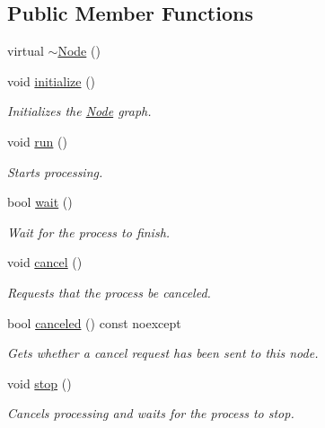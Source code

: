 \subsection*{Public Member Functions}
\begin{DoxyCompactItemize}
\item 
virtual \hyperlink{classdg_1_1deepcore_1_1_node_adb976ec538663efc018da5093005dfa1}{$\sim$\+Node} ()
\item 
void \hyperlink{classdg_1_1deepcore_1_1_node_a3831f1668d879b332399e924dbc9353f}{initialize} ()
\begin{DoxyCompactList}\small\item\em Initializes the \hyperlink{classdg_1_1deepcore_1_1_node}{Node} graph. \end{DoxyCompactList}\item 
void \hyperlink{classdg_1_1deepcore_1_1_node_adcb95b4c68f66b47a48e74cde6ae4365}{run} ()
\begin{DoxyCompactList}\small\item\em Starts processing. \end{DoxyCompactList}\item 
bool \hyperlink{classdg_1_1deepcore_1_1_node_af284d89032bf3b5327abe1814d0f23ac}{wait} ()
\begin{DoxyCompactList}\small\item\em Wait for the process to finish. \end{DoxyCompactList}\item 
void \hyperlink{classdg_1_1deepcore_1_1_node_ad3ab485f9b926cf1f1496564002e0f39}{cancel} ()
\begin{DoxyCompactList}\small\item\em Requests that the process be canceled. \end{DoxyCompactList}\item 
bool \hyperlink{classdg_1_1deepcore_1_1_node_a7965fe922b25cd1ff8f4733dad12e157}{canceled} () const noexcept
\begin{DoxyCompactList}\small\item\em Gets whether a cancel request has been sent to this node. \end{DoxyCompactList}\item 
void \hyperlink{classdg_1_1deepcore_1_1_node_ac1b4b96ad7fdbc818bb1fe3c2433c322}{stop} ()
\begin{DoxyCompactList}\small\item\em Cancels processing and waits for the process to stop. \end{DoxyCompactList}\item 

\end{DoxyCompactItemize}
